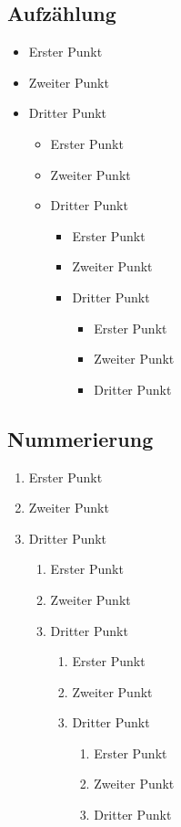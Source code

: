 \documentclass[a4paper,12pt]{article}
\begin{document}
\subsection{Aufzählung}
\begin{itemize}
	\item Erster Punkt
	\item Zweiter Punkt
	\item Dritter Punkt
	\begin{itemize}
		\item Erster Punkt
		\item Zweiter Punkt
		\item Dritter Punkt
		\begin{itemize}
			\item Erster Punkt
			\item Zweiter Punkt
			\item Dritter Punkt
			\begin{itemize}
				\item Erster Punkt
				\item Zweiter Punkt
				\item Dritter Punkt
			\end{itemize}
		\end{itemize}
	\end{itemize}
\end{itemize}

\subsection{Nummerierung}
\begin{enumerate}
	\item Erster Punkt
	\item Zweiter Punkt
	\item Dritter Punkt
	\begin{enumerate}
		\item Erster Punkt
		\item Zweiter Punkt
		\item Dritter Punkt
		\begin{enumerate}
			\item Erster Punkt
			\item Zweiter Punkt
			\item Dritter Punkt
			\begin{enumerate}
				\item Erster Punkt
				\item Zweiter Punkt
				\item Dritter Punkt
			\end{enumerate}
		\end{enumerate}
	\end{enumerate}
\end{enumerate}
\end{document}
